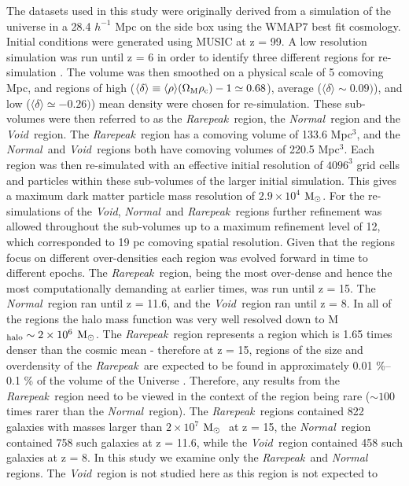 \documentclass[graphics, twocolumn, usenatbib]{mn2e}
\newcommand{\mpch} {\rm $h^{-1}$ Mpc\,\,}
\newcommand{\msolar} {$\rm{M_{\odot}}~$}
\newcommand{\msolarc} {$\rm{M_{\odot}}$}
\newcommand{\rarepeak} {\textit{Rarepeak~}}
\newcommand{\normal} {\textit{Normal~}}
\newcommand{\void} {\textit{Void~}}
\newcommand{\voidc} {\textit{Void}}
\begin{document}
The datasets used in this study were originally derived from a simulation of the universe in a 28.4
\mpch on the side box using the WMAP7 best fit cosmology. Initial conditions were generated using
MUSIC \citep{Hahn_2011} at z = 99. A low resolution simulation was run until z = 6 in order to
identify three different regions for re-simulation \citep{Chen_2014}. The volume was then smoothed
on a physical scale of 5 comoving Mpc, and regions of high
($\langle\delta\rangle \equiv \langle\rho\rangle(\Omega_{\rm M} \rho_{\rm c}) - 1 \simeq 0.68$),
average ($\langle\delta\rangle \sim 0.09)$), and low ($\langle\delta\rangle \simeq -0.26)$)
mean density were chosen for re-simulation. These sub-volumes were then referred to as the
\rarepeak region, the \normal region  and the \void region. The \rarepeak region has a comoving
volume of 133.6 Mpc$^3$, and the \normal and \void regions both have comoving volumes of 220.5
Mpc$^3$. Each region was then re-simulated with an effective initial resolution of $4096^3$ grid
cells and particles within these sub-volumes of the larger initial simulation. This gives a maximum
dark matter particle mass resolution of $2.9 \times 10^4$ \msolarc. For the re-simulations of the
\voidc, \normal and \rarepeak regions further refinement was allowed throughout the sub-volumes up
to a maximum refinement level of 12, which corresponded to 19 pc comoving spatial resolution. Given
that the regions focus on different over-densities each region was evolved forward in time to
different epochs. The \rarepeak region, being the most over-dense and hence the most
computationally demanding at earlier times, was run until z = 15. The \normal region ran until z =
11.6, and the \void region ran until z = 8. In all of the regions the halo mass function was very
well resolved down to M$_{\rm halo} \sim 2 \times 10^6$ \msolarc. The \rarepeak region represents a
region which is 1.65 times denser than the cosmic mean - therefore at z = 15, regions of the
size and overdensity of the \rarepeak are expected to be found in approximately 0.01 \%–0.1 \%
of the volume of the Universe \citep{Wise_2019}. Therefore, any results from the
\rarepeak region need to be viewed in the context of the region being rare ($\sim 100$ times
rarer than the \normal region).
The \rarepeak regions contained 822 galaxies with masses larger than $2 \times 10^7$ \msolar
at z = 15, the \normal region contained 758 such galaxies at z = 11.6, while the \void region
contained 458 such galaxies at z = 8. In this study we examine only the \rarepeak and \normal
regions. The \void region is not studied here as this region is not expected to 
\end{document}

